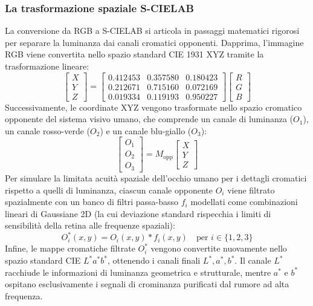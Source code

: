 \subsubsection{La trasformazione spaziale S-CIELAB}
La conversione da RGB a S-CIELAB si articola in passaggi matematici rigorosi per separare la luminanza dai canali cromatici opponenti.
Dapprima, l'immagine RGB viene convertita nello spazio standard CIE 1931 XYZ tramite la trasformazione lineare:
\begin{equation}
    \begin{bmatrix} X \\ Y \\ Z \end{bmatrix} = \begin{bmatrix} 0.412453 & 0.357580 & 0.180423 \\ 0.212671 & 0.715160 & 0.072169 \\ 0.019334 & 0.119193 & 0.950227 \end{bmatrix} \begin{bmatrix} R \\ G \\ B \end{bmatrix}
\end{equation}
Successivamente, le coordinate XYZ vengono trasformate nello spazio cromatico opponente del sistema visivo umano, che comprende un canale di luminanza ($O_1$), un canale rosso-verde ($O_2$) e un canale blu-giallo ($O_3$):
\begin{equation}
    \begin{bmatrix} O_1 \\ O_2 \\ O_3 \end{bmatrix} = M_{\text{opp}} \begin{bmatrix} X \\ Y \\ Z \end{bmatrix}
\end{equation}
Per simulare la limitata acuità spaziale dell'occhio umano per i dettagli cromatici rispetto a quelli di luminanza, ciascun canale opponente $O_i$ viene filtrato spazialmente con un banco di filtri passa-basso $f_i$ modellati come combinazioni lineari di Gaussiane 2D (la cui deviazione standard rispecchia i limiti di sensibilità della retina alle frequenze spaziali):
\begin{equation}
    O_i^*(x,y) = O_i(x,y) * f_i(x,y) \quad \text{per } i \in \{1, 2, 3\}
\end{equation}
Infine, le mappe cromatiche filtrate $O_i^*$ vengono convertite nuovamente nello spazio standard CIE $L^*a^*b^*$, ottenendo i canali finali $L^*, a^*, b^*$. Il canale $L^*$ racchiude le informazioni di luminanza geometrica e strutturale, mentre $a^*$ e $b^*$ ospitano esclusivamente i segnali di crominanza purificati dal rumore ad alta frequenza.

